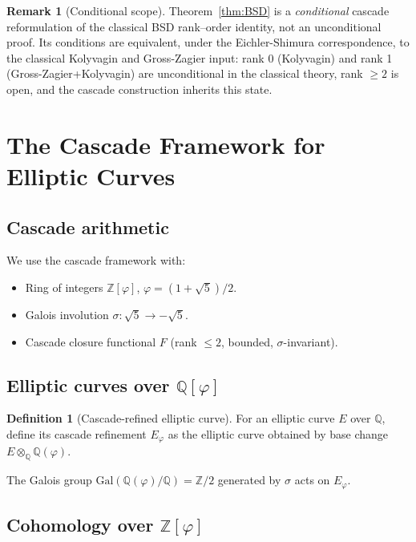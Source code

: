 \documentclass[11pt, a4paper]{amsart}
\theoremstyle{definition}
\newtheorem{definition}[theorem]{Definition}
\newtheorem{remark}[theorem]{Remark}
\newcommand{\Q}{\mathbb{Q}}
\newcommand{\Z}{\mathbb{Z}}
\newcommand{\pphi}{\varphi}
\begin{document}
\begin{remark}[Conditional scope]
Theorem~\ref{thm:BSD} is a \emph{conditional} cascade
reformulation of the classical BSD rank--order identity, not an
unconditional proof. Its conditions are equivalent, under the
Eichler-Shimura correspondence, to the classical Kolyvagin and
Gross-Zagier input: rank 0 (Kolyvagin) and rank 1
(Gross-Zagier+Kolyvagin) are unconditional in the classical
theory, rank $\geq 2$ is open, and the cascade construction
inherits this state.
\end{remark}

\section{The Cascade Framework for Elliptic Curves}\label{sec:T_E}

\subsection{Cascade arithmetic}

We use the cascade framework \cite{CascadeFoundations} with:
\begin{itemize}
\item Ring of integers $\Z[\pphi]$, $\pphi = (1 + \sqrt 5)/2$.
\item Galois involution $\sigma: \sqrt 5 \to -\sqrt 5$.
\item Cascade closure functional $F$ (rank $\leq 2$, bounded, $\sigma$-invariant).
\end{itemize}

\subsection{Elliptic curves over $\Q[\pphi]$}

\begin{definition}[Cascade-refined elliptic curve]\label{def:cascE}
For an elliptic curve $E$ over $\Q$, define its cascade refinement
$E_{\pphi}$ as the elliptic curve obtained by base change $E \otimes_\Q \Q(\pphi)$.
\end{definition}

The Galois group $\mathrm{Gal}(\Q(\pphi)/\Q) = \Z/2$ generated by
$\sigma$ acts on $E_\pphi$.

\subsection{Cohomology over $\Z[\pphi]$}
\end{document}
